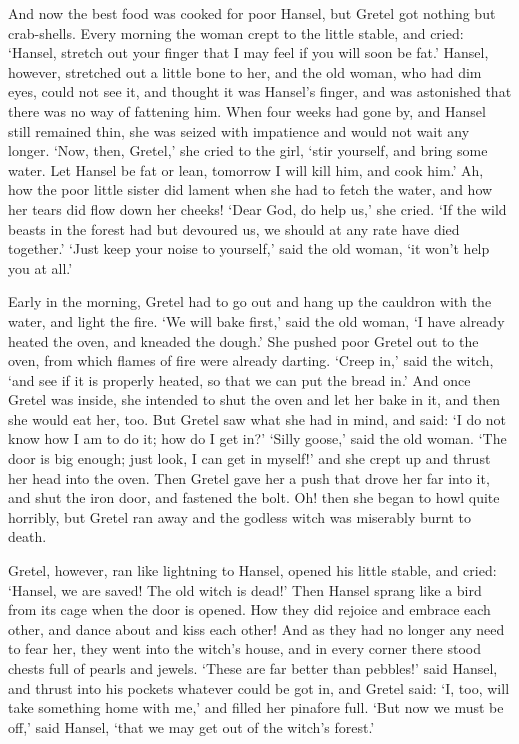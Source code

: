 And now the best food was cooked for poor Hansel, but Gretel got nothing but crab-shells. Every morning the woman crept to the little stable, and cried: `Hansel, stretch out your finger that I may feel if you will soon be fat.' Hansel, however, stretched out a little bone to her, and the old woman, who had dim eyes, could not see it, and thought it was Hansel's finger, and was astonished that there was no way of fattening him. When four weeks had gone by, and Hansel still remained thin, she
was seized with impatience and would not wait any longer. `Now, then, Gretel,' she cried to the girl, `stir yourself, and bring some water. Let Hansel be fat or lean, tomorrow I will kill him, and cook him.' Ah, how the poor little sister did lament when she had to fetch the water, and how her tears did flow down her cheeks! `Dear God, do help us,' she cried. `If the wild beasts in the forest had but devoured us, we should at any rate have died together.' `Just keep your noise to yourself,' said the old woman, `it won't help you at all.'

Early in the morning, Gretel had to go out and hang up the cauldron with the water, and light the fire. `We will bake first,' said the old woman, `I have already heated the oven, and kneaded the dough.' She pushed poor Gretel out to the oven, from which flames of fire were already darting. `Creep in,' said the witch, `and see if it is properly heated, so that we can put the bread in.' And once Gretel was inside, she intended to shut the oven and let her bake in it, and then she would eat her, too. But Gretel saw what she had in mind, and said: `I do not know how I am to do it; how do I get in?' `Silly goose,' said the old woman. `The door is big enough; just look, I can get in myself!' and she crept up and thrust her head into the oven. Then Gretel gave her a push that drove her far into it, and shut the iron door, and fastened the bolt. Oh! then she began to howl quite horribly, but Gretel ran away and the godless witch was miserably burnt to death.

Gretel, however, ran like lightning to Hansel, opened his little stable, and cried: `Hansel, we are saved! The old witch is dead!' Then Hansel sprang like a bird from its cage when the door is opened. How they did rejoice and embrace each other, and dance about and kiss each other! And as they had no longer any need to fear her, they went into the witch's house, and in every corner there stood chests full of pearls and jewels. `These are far better than pebbles!' said Hansel, and thrust into his
pockets whatever could be got in, and Gretel said: `I, too, will take something home with me,' and filled her pinafore full. `But now we must be off,' said Hansel, `that we may get out of the witch's forest.'

